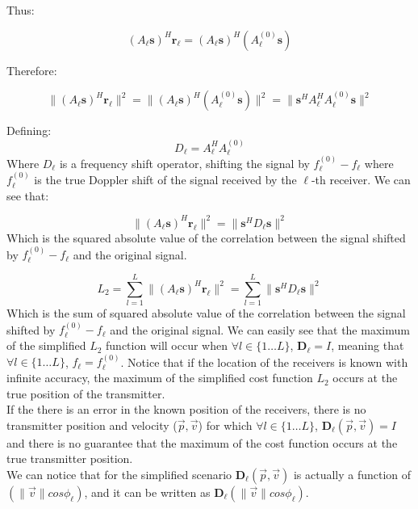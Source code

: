 \documentclass[10pt,a4paper]{report}
\begin{document}
Thus:

\begin{equation}
\label{eq:simplifiedanalysis1}
(A_\ell\mathbf{s})^H\mathbf{r_\ell}=(A_\ell\mathbf{s})^H(A^{(0)}_\ell \mathbf{s})
\end{equation}

Therefore:

\begin{equation}
\|(A_\ell\mathbf{s})^H\mathbf{r_\ell}\|^2=\|(A_\ell\mathbf{s})^H(A^{(0)}_\ell \mathbf{s})\|^2=\|\mathbf{s}^H A_\ell^H A^{(0)}_\ell \mathbf{s}\|^2
\end{equation}

Defining:
\begin{equation}
D_\ell = A_\ell^H A^{(0)}_\ell
\end{equation}
Where $D_\ell$ is a frequency shift operator, shifting the signal by $f^{(0)}_\ell-f_\ell$ where $f^{(0)}_\ell$ is
the true Doppler shift of the signal received by the $\ell$-th receiver.
We can see that:

\begin{equation}
\|(A_\ell\mathbf{s})^H\mathbf{r_\ell}\|^2 = \|\mathbf{s}^H D_\ell \mathbf{s}\|^2
\end{equation}
Which is the squared absolute value of the correlation between the signal shifted by $f^{(0)}_\ell-f_\ell$ and the original signal.


\begin{equation}
L_2 = \sum_{l=1}^L \|(A_\ell\mathbf{s})^H\mathbf{r_\ell}\|^2 = \sum_{l=1}^L \|\mathbf{s}^H D_\ell \mathbf{s}\|^2
\end{equation}
Which is the sum of squared absolute value of the correlation between the signal shifted by $f^{(0)}_\ell-f_\ell$ and the original signal.
We can easily see that the maximum of the simplified $L_2$ function will occur when 
$\forall l \in \{1 \dots L \}$, $\mathbf{D_\ell}=I$, meaning that $\forall l \in \{1 \dots L \}$, 
$f_\ell = f^{(0)}_\ell$.
Notice that if the location of the receivers is known with infinite accuracy, the maximum
of the simplified cost function $L_2$ occurs at the true position of the transmitter.\\
If the there is an error in the known position of the receivers, there is no transmitter position and velocity ($\vec{p}, \vec{v}$) for which $\forall l \in\{1\dots L\}$, $\mathbf{D_\ell}(\vec{p},\vec{v}) = I$ and there is no guarantee that the maximum of the cost function occurs at the true transmitter position.
\\
We can notice that for the simplified scenario $\mathbf{D_\ell}(\vec{p},\vec{v})$ is actually a function of
$(\|\vec{v}\|cos\phi_\ell)$, and it can be written as $\mathbf{D_\ell}(\|\vec{v}\|cos\phi_\ell)$.
\end{document}
